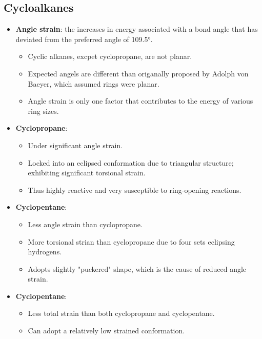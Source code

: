 \documentclass[12pt,a4paper]{article}
\begin{document}
\subsection{Cycloalkanes}
\begin{itemize}
    \item \textbf{Angle strain}: the increases in energy associated with a bond angle that has deviated from the preferred angle of \ang{109.5}. 
        \begin{itemize}
            \item Cyclic alkanes, excpet cyclopropane, are {\color{o-Sun}not planar}. 
            \item Expected angels are different than origanally proposed by Adolph von Baeyer, which assumed rings were planar.
            \item Angle strain is only one factor that contributes to the energy of various ring sizes.
        \end{itemize}
    \item \textbf{Cyclopropane}:
        \begin{itemize}
            \item Under significant angle strain.
            \item Locked into an eclipsed conformation due to triangular structure; exhibiting significant torsional strain.
            \item Thus highly reactive and very susceptible to ring-opening reactions.
        \end{itemize}
    \item \textbf{Cyclopentane}: 
        \begin{itemize}
            \item Less angle strain than cyclopropane. 
            \item More torsional strian than cyclopropane due to four sets eclipsing hydrogens.
            \item Adopts slightly "puckered" shape, which is the cause of reduced angle strain.
        \end{itemize}
    \item \textbf{Cyclopentane}:
        \begin{itemize}
            \item Less total strain than both cyclopropane and cyclopentane.
            \item Can adopt a relatively low strained conformation.
        \end{itemize}

\end{itemize}
\end{document}
